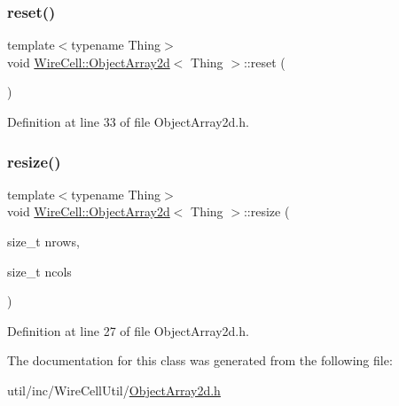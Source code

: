 \subsubsection{\texorpdfstring{reset()}{reset()}}
{\footnotesize\ttfamily template$<$typename Thing$>$ \\
void \hyperlink{class_wire_cell_1_1_object_array2d}{Wire\+Cell\+::\+Object\+Array2d}$<$ Thing $>$\+::reset (\begin{DoxyParamCaption}{ }\end{DoxyParamCaption})\hspace{0.3cm}{\ttfamily [inline]}}



Definition at line 33 of file Object\+Array2d.\+h.

\mbox{\label{class_wire_cell_1_1_object_array2d_ae7e6ea58247ef094b06452cbe9fe70e6}} 
\subsubsection{\texorpdfstring{resize()}{resize()}}
{\footnotesize\ttfamily template$<$typename Thing$>$ \\
void \hyperlink{class_wire_cell_1_1_object_array2d}{Wire\+Cell\+::\+Object\+Array2d}$<$ Thing $>$\+::resize (\begin{DoxyParamCaption}\item[{size\+\_\+t}]{nrows,  }\item[{size\+\_\+t}]{ncols }\end{DoxyParamCaption})\hspace{0.3cm}{\ttfamily [inline]}}



Definition at line 27 of file Object\+Array2d.\+h.



The documentation for this class was generated from the following file\+:\begin{DoxyCompactItemize}
\item 
util/inc/\+Wire\+Cell\+Util/\hyperlink{_object_array2d_8h}{Object\+Array2d.\+h}\end{DoxyCompactItemize}
